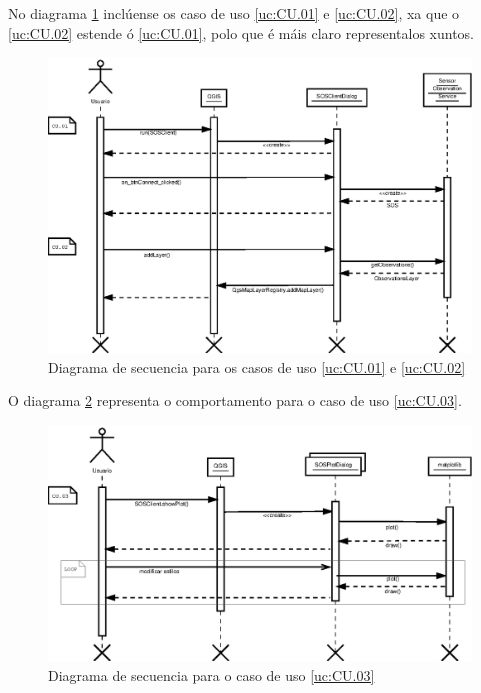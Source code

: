 No diagrama \ref{fig:diaSeq1-2} inclúense os caso de uso \ref{uc:CU.01} e \ref{uc:CU.02}, xa que o \ref{uc:CU.02} estende ó \ref{uc:CU.01}, polo que é máis claro representalos xuntos.
\begin{figure}
 \centering
 \includegraphics[width=\textwidth]{images/seq1-2.eps}
 \caption{Diagrama de secuencia para os casos de uso \ref{uc:CU.01} e \ref{uc:CU.02}}
 \label{fig:diaSeq1-2}
\end{figure}

O diagrama \ref{fig:diaSeq3} representa o comportamento para o caso de uso \ref{uc:CU.03}.
\begin{figure}
 \centering
 \includegraphics[width=\textwidth]{images/seq3.eps}
 \caption{Diagrama de secuencia para o caso de uso \ref{uc:CU.03}}
 \label{fig:diaSeq3}
\end{figure}


